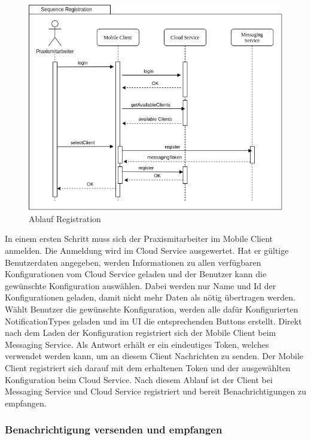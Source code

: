 \begin{figure}[h]
    \centering
    \begin{minipage}[b]{0.7\textwidth}
        \includegraphics[width=\textwidth]{graphics/Sequence_Notification_Register}
        \caption{Ablauf Registration}
    \end{minipage}
\end{figure}

In einem ersten Schritt muss sich der Praxismitarbeiter im Mobile Client anmelden.
Die Anmeldung wird im Cloud Service ausgewertet.
Hat er gültige Benutzerdaten angegeben, werden Informationen zu allen verfügbaren Konfigurationen vom Cloud Service geladen und der Benutzer kann die gewünschte Konfiguration auswählen.
Dabei werden nur Name und Id der Konfigurationen geladen, damit nicht mehr Daten als nötig übertragen werden.
Wählt Benutzer die gewünschte Konfiguration, werden alle dafür Konfigurierten NotificationTypes geladen und im UI die entsprechenden Buttons erstellt.
Direkt nach dem Laden der Konfiguration registriert sich der Mobile Client beim Messaging Service.
Als Antwort erhält er ein eindeutiges Token, welches verwendet werden kann, um an diesem Client Nachrichten zu senden.
Der Mobile Client registriert sich darauf mit dem erhaltenen Token und der ausgewählten Konfiguration beim Cloud Service.
Nach diesem Ablauf ist der Client bei Messaging Service und Cloud Service registriert und bereit Benachrichtigungen zu empfangen.

\subsubsection*{Benachrichtigung versenden und empfangen}

